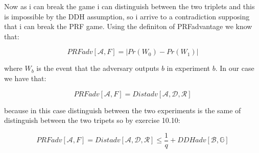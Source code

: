 \documentclass{article}
\begin{document}
Now as i can break the game i can distinguish between the two triplets and this is impossible by the DDH assumption, so i arrive to a contradiction supposing that i can break the PRF game. Using the definiton of PRFadvantage we know that:

$$PRFadv[\mathcal{A},F]=|Pr(W_{0})-Pr(W_{1})|$$

where $W_{b}$ is the event that the adversary outputs $b$ in experiment $b$. In our case we have that:

$$PRFadv[\mathcal{A},F]=Distadv[\mathcal{A},\mathcal{D},\mathcal{R}]$$

because in this case distinguish between the two experiments is the same of distinguish between the two tripets so by exercise 10.10:

$$PRFadv[\mathcal{A},F]=Distadv[\mathcal{A},\mathcal{D},\mathcal{R}]\leq \frac{1}{q}+ DDHadv[\mathcal{B},\mathbb{G}]$$
\end{document}
